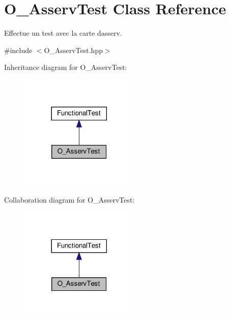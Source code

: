 \hypertarget{classO__AsservTest}{}\section{O\+\_\+\+Asserv\+Test Class Reference}
\label{classO__AsservTest}


Effectue un test avec la carte d\textquotesingle{}asserv.  




{\ttfamily \#include $<$O\+\_\+\+Asserv\+Test.\+hpp$>$}



Inheritance diagram for O\+\_\+\+Asserv\+Test\+:
\nopagebreak
\begin{figure}[H]
\begin{center}
\leavevmode
\includegraphics[width=161pt]{classO__AsservTest__inherit__graph}
\end{center}
\end{figure}


Collaboration diagram for O\+\_\+\+Asserv\+Test\+:
\nopagebreak
\begin{figure}[H]
\begin{center}
\leavevmode
\includegraphics[width=161pt]{classO__AsservTest__coll__graph}
\end{center}
\end{figure}

